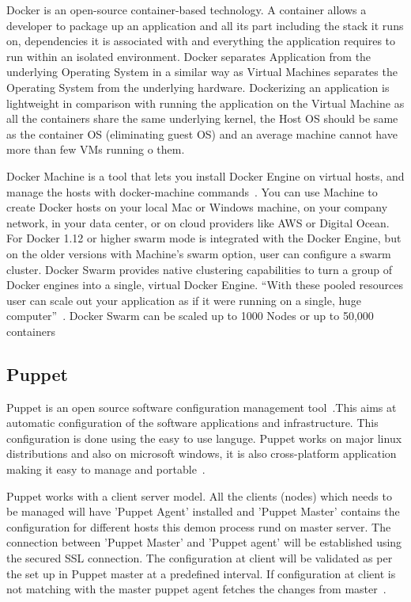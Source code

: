      Docker is an open-source container-based technology. A container
     allows a developer to package up an application and all its part
     including the stack it runs on, dependencies it is associated
     with and everything the application requires to run within an
     isolated environment. Docker separates Application from the
     underlying Operating System in a similar way as Virtual Machines
     separates the Operating System from the underlying
     hardware. Dockerizing an application is lightweight in comparison
     with running the application on the Virtual Machine as all the
     containers share the same underlying kernel, the Host OS should
     be same as the container OS (eliminating guest OS) and an average
     machine cannot have more than few VMs running o them.

     Docker Machine is a tool that lets you install Docker Engine on
     virtual hosts, and manage the hosts with docker-machine
     commands~\cite{docker-book}. You can use Machine to create Docker
     hosts on your local Mac or Windows machine, on your company
     network, in your data center, or on cloud providers like AWS or
     Digital Ocean. For Docker 1.12 or higher swarm mode is integrated
     with the Docker Engine, but on the older versions with Machine's
     swarm option, user can configure a swarm cluster. Docker Swarm
     provides native clustering capabilities to turn a group of Docker
     engines into a single, virtual Docker Engine. ``With these pooled
     resources user can scale out your application as if it were
     running on a single, huge computer''~\cite{www-docker}. Docker
     Swarm can be scaled up to 1000 Nodes or up to 50,000 containers
     
\subsection{Puppet}

Puppet is an open source software configuration management
tool~\cite{www-puppet-wiki-puppet}.This aims at automatic
configuration of the software applications and infrastructure. This
configuration is done using the easy to use languge.  Puppet works on
major linux distributions and also on microsoft windows, it is also
cross-platform application making it easy to manage and
portable~\cite{www-puppet-puppet-site}.

Puppet works with a client server model. All the clients (nodes)
which needs to be managed will have 'Puppet Agent' installed and
'Puppet Master' contains the configuration for different hosts this
demon process rund on master server. The connection between 'Puppet
Master' and 'Puppet agent' will be established using the secured SSL
connection. The configuration at client will be validated as per the
set up in Puppet master at a predefined interval. If configuration at
client is not matching with the master puppet agent fetches the
changes from master~\cite{www-puppet-slashroot}.


